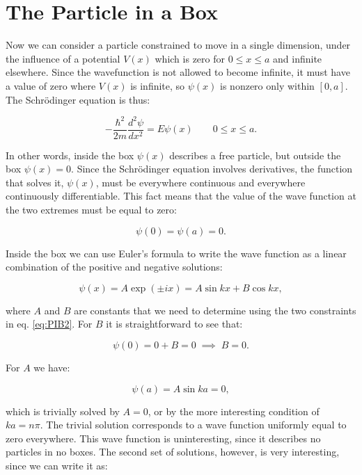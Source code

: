 \documentclass[
  9pt,
]{extbook}
\theoremstyle{definition}
\theoremstyle{definition}
\theoremstyle{definition}
\theoremstyle{remark}
\begin{document}
\hypertarget{rigidrotor}{%
\section{The Particle in a Box}\label{rigidrotor}}

Now we can consider a particle constrained to move in a single dimension, under the influence of a potential \(V(x)\) which is zero for \(0 \leq x \leq a\) and infinite elsewhere. Since the wavefunction is not allowed to become infinite, it must have a value of zero where \(V(x)\) is infinite, so \(\psi(x)\) is nonzero only within \([0,a]\). The Schrödinger equation is thus:

\begin{equation}
- \frac{\hbar^2}{2m} \frac{d^2\psi}{dx^2} = E \psi(x)
\qquad 0 \leq x \leq a.
\label{eq:PIB1}
\end{equation}

In other words, inside the box \(\psi(x)\) describes a free particle, but outside the box \(\psi(x)=0\). Since the Schrödinger equation involves derivatives, the function that solves it, \(\psi(x)\), must be everywhere continuous and everywhere continuously differentiable. This fact means that the value of the wave function at the two extremes must be equal to zero:

\begin{equation}
\psi(0)=\psi(a)=0.
\label{eq:PIB2}
\end{equation}

Inside the box we can use Euler's formula to write the wave function as a linear combination of the positive and negative solutions:

\begin{equation}
\psi(x)=A \exp(\pm ix)=A \sin kx + B \cos kx,
\label{eq:PIB3}
\end{equation}

where \(A\) and \(B\) are constants that we need to determine using the two constraints in eq. \eqref{eq:PIB2}. For \(B\) it is straightforward to see that:

\begin{equation}
\psi(0)= 0 + B =0 \; \implies \; B=0.
\label{eq:PIB4}
\end{equation}

For \(A\) we have:

\begin{equation}
\psi(a)= A\sin ka = 0,
\label{eq:PIB5}
\end{equation}

which is trivially solved by \(A=0\), or by the more interesting condition of \(ka=n\pi\). The trivial solution corresponds to a wave function uniformly equal to zero everywhere. This wave function is uninteresting, since it describes no particles in no boxes. The second set of solutions, however, is very interesting, since we can write it as:
\end{document}
